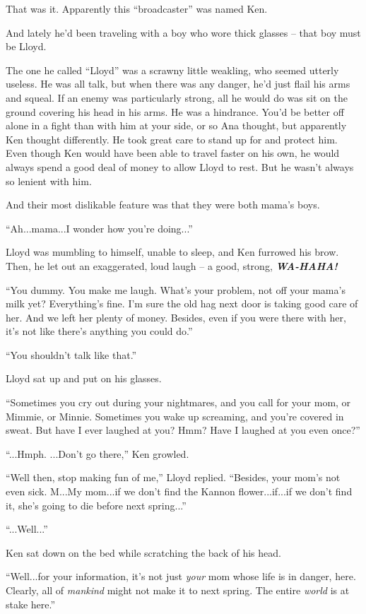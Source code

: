 \documentclass[
]{article}
\begin{document}
That was it. Apparently this ``broadcaster'' was named Ken.

And lately he'd been traveling with a boy who wore thick glasses -- that
boy must be Lloyd.

The one he called ``Lloyd'' was a scrawny little weakling, who seemed
utterly useless. He was all talk, but when there was any danger, he'd
just flail his arms and squeal. If an enemy was particularly strong, all
he would do was sit on the ground covering his head in his arms. He was
a hindrance. You'd be better off alone in a fight than with him at your
side, or so Ana thought, but apparently Ken thought differently. He took
great care to stand up for and protect him. Even though Ken would have
been able to travel faster on his own, he would always spend a good deal
of money to allow Lloyd to rest. But he wasn't always so lenient with
him.

And their most dislikable feature was that they were both mama's boys.

``Ah...mama...I wonder how you're doing...''

Lloyd was mumbling to himself, unable to sleep, and Ken furrowed his
brow. Then, he let out an exaggerated, loud laugh -- a good, strong,
\emph{\textbf{WA-HAHA!}}

``You dummy. You make me laugh. What's your problem, not off your mama's
milk yet? Everything's fine. I'm sure the old hag next door is taking
good care of her. And we left her plenty of money. Besides, even if you
were there with her, it's not like there's anything you could do.''

``You shouldn't talk like that.''

Lloyd sat up and put on his glasses.

``Sometimes you cry out during your nightmares, and you call for your
mom, or Mimmie, or Minnie. Sometimes you wake up screaming, and you're
covered in sweat. But have I ever laughed at you? Hmm? Have I laughed at
you even once?''

``...Hmph. ...Don't go there,'' Ken growled.

``Well then, stop making fun of me,'' Lloyd replied. ``Besides, your
mom's not even sick. M...My mom...if we don't find the Kannon
flower...if...if we don't find it, she's going to die before next
spring...''

``...Well...''

Ken sat down on the bed while scratching the back of his head.

``Well...for your information, it's not just \emph{your} mom whose life
is in danger, here. Clearly, all of \emph{mankind} might not make it to
next spring. The entire \emph{world} is at stake here.''
\end{document}

